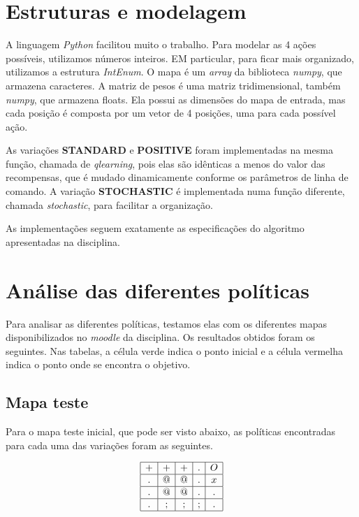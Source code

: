 \documentclass{article}
\begin{document}
\section{Estruturas e modelagem}

A linguagem \textit{Python} facilitou muito o trabalho. Para modelar as 4 ações possíveis, utilizamos números inteiros. EM particular, para ficar mais organizado,
utilizamos a estrutura \textit{IntEnum}. O mapa é um \textit{array} da biblioteca \textit{numpy}, que armazena caracteres. A matriz de pesos é uma matriz tridimensional,
também \textit{numpy}, que armazena floats. Ela possui as dimensões do mapa de entrada, mas cada posição é composta por um vetor de 4 posições, uma para cada possível ação.

As variações \textbf{STANDARD} e \textbf{POSITIVE} foram implementadas na mesma função, chamada de \textit{qlearning}, pois elas são idênticas a menos do valor das recompensas, que é mudado dinamicamente conforme
os parâmetros de linha de comando. A variação \textbf{STOCHASTIC} é implementada numa função diferente, chamada \textit{stochastic}, para facilitar a organização.

As implementações seguem exatamente as especificações do algoritmo apresentadas na disciplina.

\section{Análise das diferentes políticas}

Para analisar as diferentes políticas, testamos elas com os diferentes mapas disponibilizados no \textit{moodle} da disciplina. Os resultados obtidos foram os seguintes.
Nas tabelas, a célula verde indica o ponto inicial e a célula vermelha indica o ponto onde se encontra o objetivo.

\subsection{Mapa teste}

Para o mapa teste inicial, que pode ser visto abaixo, as políticas encontradas para cada uma das variações foram as seguintes.

\begin{center}
	\[
		\begin{array}{|c|c|c|c|c|}
			\hline
			+ & + & + & . & O \\ \hline
			. & @ & @ & . & x \\ \hline
			. & @ & @ & . & . \\ \hline
			. & ; & ; & ; & . \\ \hline
		\end{array}
	\]
\end{center}
\end{document}
